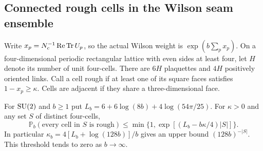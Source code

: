 \subsection{Connected rough cells in the Wilson seam ensemble}\label{cl:sec:rough-seams}

Write $x_p=N_c^{-1}\operatorname{Re}\operatorname{Tr} U_p$, so the actual Wilson weight is
$\exp(b\sum_p x_p)$. On a four-dimensional periodic rectangular lattice
with even sides at least four, let $H$ denote its number of unit
four-cells. There are $6H$ plaquettes and $4H$ positively oriented links.
Call a cell rough if at least one of its square faces satisfies
$1-x_p\ge\kappa$. Cells are adjacent if they share a three-dimensional face.

\begin{theorem}\label{cl:thm:rough-cells}
For $\mathrm{SU}(2)$ and $b\ge1$ put $L_b=6+6\log(8b)+4\log(54\pi/25)$.
For $\kappa>0$ and any set $S$ of distinct four-cells,
\[
 {\mathbb P}_b(\text{every cell in }S\text{ is rough})
 \le \min\{1,\exp[(L_b-b\kappa/4)|S|]\}.
\]
In particular $\kappa_b=4[L_b+\log(128b)]/b$ gives an upper bound
$(128b)^{-|S|}$. This threshold tends to zero as $b\to\infty$.
\end{theorem}

